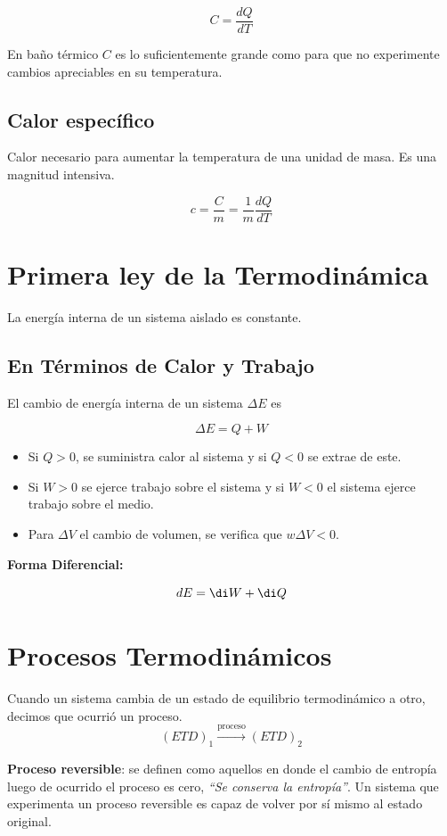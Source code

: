 \[C = \frac{dQ}{dT}\]

En baño térmico $C$ es lo suficientemente grande como para que no experimente cambios apreciables en su temperatura.

\subsection{Calor específico}

Calor necesario para aumentar la temperatura de una unidad de masa. Es una magnitud intensiva.

\[c = \frac{C}{m} = \frac{1}{m}\frac{dQ}{dT}\]

\section{Primera ley de la Termodinámica}
\label{1ley}
La energía interna de un sistema aislado es constante.

\subsection{En Términos de Calor y Trabajo}

El cambio de energía interna de un sistema $\Delta E$ es

\[\Delta E = Q+W\]

\begin{itemize}
    \item Si $Q>0$, se suministra calor al sistema y si $Q<0$ se extrae de este.
    \item Si $W>0$ se ejerce trabajo sobre el sistema y si $W<0$ el sistema ejerce trabajo sobre el medio.
    \item Para $\Delta V$ el cambio de volumen, se verifica que $w\Delta V < 0$.
\end{itemize}

\textbf{Forma Diferencial:}

\[dE = \di W+ \di Q\]

\section{Procesos Termodinámicos}

Cuando un sistema cambia de un estado de equilibrio termodinámico a otro, decimos que ocurrió un proceso.
\[(ETD)_1 \xrightarrow[]{\text{proceso}} (ETD)_2 \]

\textbf{Proceso reversible}: se definen como aquellos en donde el cambio de entropía luego de ocurrido el proceso es cero, \textit{\enquote{Se conserva la entropía}}. Un sistema que experimenta un proceso reversible es capaz de volver por sí mismo al estado original.
\\

